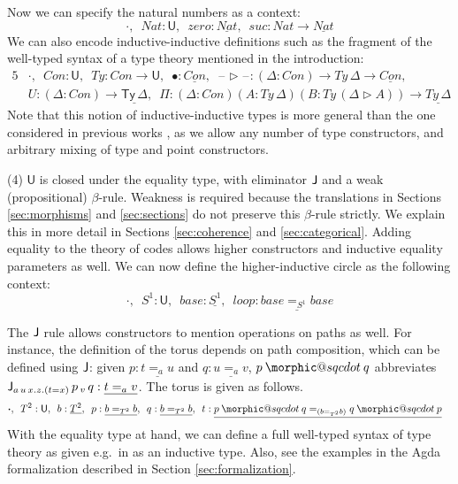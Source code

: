 \documentclass[dvipsnames]{lmcs} %
\makeatletter
\DeclareRobustCommand{\sqcdot}{\mathbin{\mathpalette\morphic@sqcdot\relax}}
\newcommand{\morphic@sqcdot}[2]{%
  \sbox\z@{$\m@th#1\centerdot$}%
  \ht\z@=.33333\ht\z@
  \vcenter{\box\z@}%
}
\newcommand{\U}{\mathsf{U}}
\newcommand{\ra}{\rightarrow}
\newcommand{\Ty}{\mathsf{Ty}}
\newcommand{\blank}{\mathord{\hspace{1pt}\text{--}\hspace{1pt}}}
\newcommand{\1}{\mathsf{1}} \renewcommand{\Pr}{\mathsf{Pr}}
\theoremstyle{plain}\newtheorem{satz}[thm]{Satz} %
\makeatother
\begin{document}
Now we can specify the natural numbers as a context:
\[
\boldsymbol{\cdot},\,\,\,Nat : \U,\,\,\,zero:\underline{Nat},\,\,\,suc:Nat\ra\underline{Nat}
\]
We can also encode inductive-inductive definitions such as the
fragment of the well-typed syntax of a type theory mentioned in the
introduction:
\begin{alignat*}{5}
  & \boldsymbol{\cdot},\,\,\,Con:\U,\,\,\,Ty:Con\ra\U,\,\,\,\bullet:\underline{Con},\,\,\,\blank\rhd\blank:(\Delta:Con)\ra Ty\,\Delta\ra\underline{Con}, \\
  & U : (\Delta:Con)\ra \underline{\Ty\,\Delta},\,\,\,\Pi:(\Delta:Con)(A:Ty\,\Delta)(B:Ty\,(\Delta\rhd A))\ra\underline{Ty\,\Delta}
\end{alignat*}
Note that this notion of inductive-inductive types is more general than the one
considered in previous works \cite{forsberg-phd}, as we allow any number of type
constructors, and arbitrary mixing of type and point constructors.

(4) $\U$ is closed under the equality type, with eliminator $\mathsf{J}$ and a weak
(propositional) $\beta$-rule. Weakness is required because the translations in
Sections \ref{sec:morphisms} and \ref{sec:sections} do not preserve this
$\beta$-rule strictly. We explain this in more detail in Sections
\ref{sec:coherence} and \ref{sec:categorical}. Adding equality to the theory of
codes allows higher constructors and inductive equality parameters as well. We
can now define the higher-inductive circle as the following context:
\[
\boldsymbol{\cdot},\,\,\,S^1:\U,\,\,\,base:\underline{S^1},\,\,\,loop:\underline{base =_{S^1} base}
\]

The $\mathsf{J}$ rule allows constructors to mention operations on paths as well. For
instance, the definition of the torus depends on path composition, which can be
defined using $\mathsf{J}$: given $p:\underline{t=_a u}$ and $q:\underline{u=_a v}$, $p
\sqcdot q$ abbreviates $\mathsf{J}_{a\,u\,x.z.(t=x)}\,p\,_v\,q : \underline{t=_a
  v}$. The torus is given as follows.
\begin{alignat*}{5}
  & \boldsymbol{\cdot},\,\,\,T^2:\U,\,\,\,b : \underline{T^2},\,\,\, p:\underline{b =_{T^2} b},\,\,\,q:\underline{b=_{T^2} b},\,\,\, t:\underline{p\sqcdot q=_{(b=_{T^2} b)} q\sqcdot p}
\end{alignat*}
With the equality type at hand, we can define a full well-typed syntax of type
theory as given e.g.\ in \cite{ttintt} as an inductive type.  Also, see the
examples in the Agda formalization described in Section
\ref{sec:formalization}.
\end{document}
